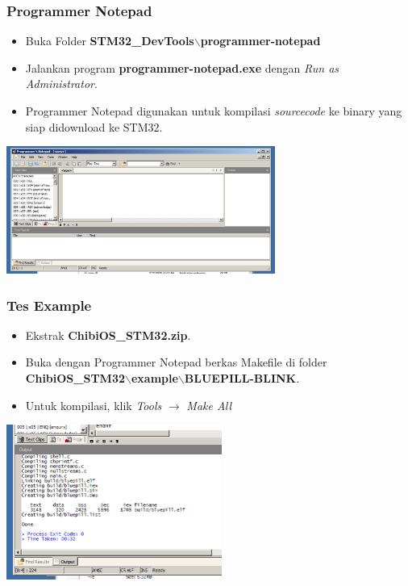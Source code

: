\documentclass[table,dvipsnames]{beamer}
\begin{document}
	\begin{frame}
		\frametitle{Programmer Notepad}
		\begin{block}{}
			\begin{itemize}
				\item Buka Folder \textbf{STM32\_DevTools$\backslash$programmer-notepad}
				\item Jalankan program \textbf{programmer-notepad.exe} dengan \textit{Run as Administrator}.
				\item Programmer Notepad digunakan untuk kompilasi \textit{sourcecode} ke binary yang siap didownload ke STM32.
			\end{itemize}
		\end{block}
		
		\begin{center}
			\includegraphics[width=250pt]{images/pn}
		\end{center}
	\end{frame}

	\begin{frame}
	\frametitle{Tes Example}
	\begin{block}{}
		\begin{itemize}
			\item Ekstrak \textbf{ChibiOS\_STM32.zip}.
			\item Buka dengan Programmer Notepad berkas Makefile di folder \textbf{ChibiOS\_STM32$\backslash$example$\backslash$BLUEPILL-BLINK}.
			\item Untuk kompilasi, klik \textit{Tools} $\rightarrow$ \textit{Make All}
		\end{itemize}
	\end{block}
	
	\begin{center}
		\includegraphics[width=200pt]{images/compile}
	\end{center}
	\end{frame}
\end{document}
